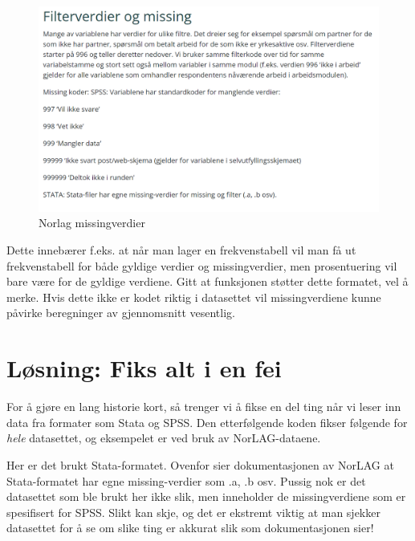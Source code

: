 \documentclass[
  letterpaper,
  DIV=11,
  numbers=noendperiod]{scrreprt}
\begin{document}
\begin{figure}

{\centering \includegraphics{./images/norlag_filterverdier.png}

}

\caption{Norlag missingverdier}

\end{figure}

Dette innebærer f.eks. at når man lager en frekvenstabell vil man få ut
frekvenstabell for både gyldige verdier og missingverdier, men
prosentuering vil bare være for de gyldige verdiene. Gitt at funksjonen
støtter dette formatet, vel å merke. Hvis dette ikke er kodet riktig i
datasettet vil missingverdiene kunne påvirke beregninger av gjennomsnitt
vesentlig.

\hypertarget{luxf8sning-fiks-alt-i-en-fei}{%
\section{Løsning: Fiks alt i en
fei}\label{luxf8sning-fiks-alt-i-en-fei}}

For å gjøre en lang historie kort, så trenger vi å fikse en del ting når
vi leser inn data fra formater som Stata og SPSS. Den etterfølgende
koden fikser følgende for \emph{hele} datasettet, og eksempelet er ved
bruk av NorLAG-dataene.

Her er det brukt Stata-formatet. Ovenfor sier dokumentasjonen av NorLAG
at Stata-formatet har egne missing-verdier som .a, .b osv. Pussig nok er
det datasettet som ble brukt her ikke slik, men inneholder de
missingverdiene som er spesifisert for SPSS. Slikt kan skje, og det er
ekstremt viktig at man sjekker datasettet for å se om slike ting er
akkurat slik som dokumentasjonen sier!
\end{document}
